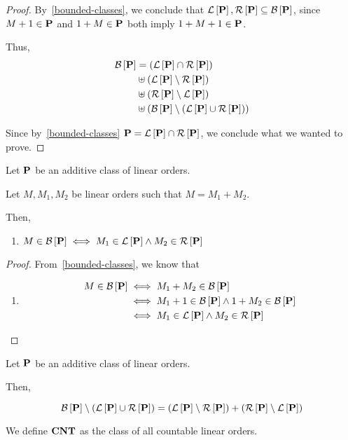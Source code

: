 \begin{proof}
  By~\cref{bounded-classes}, we conclude that
  $\lb{\pp}, \rb{\pp} \subseteq \bounded{\pp}$,
  since $M + 1 \in \pp$ and $1 + M \in \pp$ both imply $1 + M + 1 \in \pp$.

  Thus,
  \begin{align*}
    \bounded{\pp} & = \ps{\lb{\pp} \cap \rb{\pp}}                                    \\
                  & \uplus \ps{\lb{\pp} \setminus \rb{\pp}}                          \\
                  & \uplus \ps{\rb{\pp} \setminus \lb{\pp}}                          \\
                  & \uplus \ps{ \bounded{\pp} \setminus \ps{\lb{\pp} \cup \rb{\pp}}}
  \end{align*}

  Since by~\cref{bounded-classes} $\pp = \lb{\pp} \cap \rb{\pp}$,
  we conclude what we wanted to prove.
\end{proof}

\begin{lemma}
  Let $\pp$ be an additive class of linear orders.

  Let $M, M_1, M_2$ be linear orders such that
  $M = M_1 + M_2$.

  Then,
  \begin{enumerate}
    \item
          $M \in \bounded{\pp} \iff M_1 \in \lb{\pp} \wedge M_2 \in \rb{\pp}$
  \end{enumerate}
\end{lemma}

\begin{proof}
  From~\cref{bounded-classes}, we know that
  \begin{enumerate}
    \item
          \begin{align*}
            M \in \bounded{\pp}
             & \iff M_1 + M_2 \in \bounded{\pp}                                \\
             & \iff M_1 + 1 \in \bounded{\pp} \wedge 1 + M_2 \in \bounded{\pp} \\
             & \iff M_1 \in \lb{\pp} \wedge M_2 \in \rb{\pp}
          \end{align*}
  \end{enumerate}

\end{proof}

\begin{corollary}\label{bounded-is-left-plus-right}
  Let $\pp$ be an additive class of linear orders.

  Then,

  \[
    \bounded{\pp} \setminus \ps{\lb{\pp} \cup \rb{\pp}}
    = \ps{\lb{\pp} \setminus \rb{\pp}} + \ps{\rb{\pp} \setminus \lb{\pp}}
  \]
\end{corollary}

\begin{definition}
  We define $\cnt$ as the class of all countable linear orders.
\end{definition}
